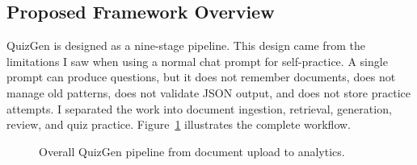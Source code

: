 \documentclass[12pt,a4paper]{article}
\begin{document}
\subsection{Proposed Framework Overview}

QuizGen is designed as a nine-stage pipeline. This design came from the
limitations I saw when using a normal chat prompt for self-practice. A
single prompt can produce questions, but it does not remember documents,
does not manage old patterns, does not validate JSON output, and does not
store practice attempts. I separated the work into document ingestion,
retrieval, generation, review, and quiz practice.
Figure~\ref{fig:framework} illustrates the complete workflow.

\begin{figure}[H]
  \centering
  \singlespacing
  \caption{Overall QuizGen pipeline from document upload to analytics.}
  \label{fig:framework}
\end{figure}
\end{document}
